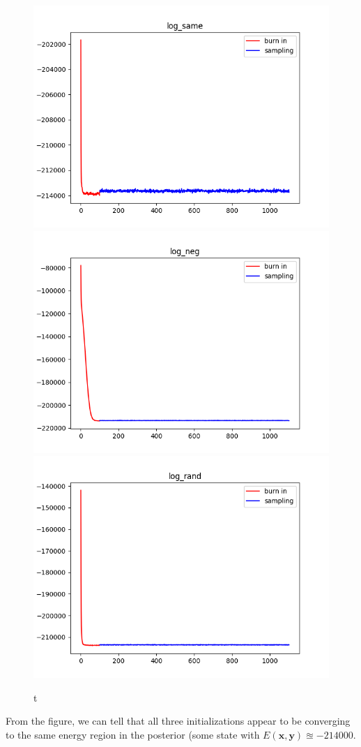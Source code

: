 \documentclass[12pt]{article}
\newcommand{\vect}[1]{\boldsymbol{#1}}
\begin{document}
\begin{enumerate}[label=(\alph*)]
\begin{figure}[h!]
\centering
\includegraphics[scale=0.5]{programming/log_same.png}
\includegraphics[scale=0.5]{programming/log_neg.png}
\includegraphics[scale=0.5]{programming/log_rand.png}
\caption{t}
\label{fig:log_energies}
\end{figure}

From the figure, we can tell that all three initializations appear to be converging to the same energy region in the posterior (some state with $E(\vect{x}, \vect{y}) \approxeq -214000$.
\end{enumerate}
\end{document}
